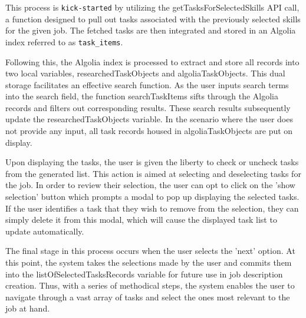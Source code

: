 This process is \verb|kick-started| by utilizing the getTasksForSelectedSkills API call, a function designed to pull out tasks associated with the previously selected skills for the given job. The fetched tasks are then integrated and stored in an Algolia index referred to as \verb|task_items|.

Following this, the Algolia index is processed to extract and store all records into two local variables, researchedTaskObjects and algoliaTaskObjects. This dual storage facilitates an effective search function. As the user inputs search terms into the search field, the function searchTaskItems sifts through the Algolia records and filters out corresponding results. These search results subsequently update the researchedTaskObjects variable. In the scenario where the user does not provide any input, all task records housed in algoliaTaskObjects are put on display.

Upon displaying the tasks, the user is given the liberty to check or uncheck tasks from the generated list. This action is aimed at selecting and deselecting tasks for the job. In order to review their selection, the user can opt to click on the 'show selection' button which prompts a modal to pop up displaying the selected tasks. If the user identifies a task that they wish to remove from the selection, they can simply delete it from this modal, which will cause the displayed task list to update automatically.

The final stage in this process occurs when the user selects the 'next' option. At this point, the system takes the selections made by the user and commits them into the listOfSelectedTasksRecords variable for future use in job description creation. Thus, with a series of methodical steps, the system enables the user to navigate through a vast array of tasks and select the ones most relevant to the job at hand.


